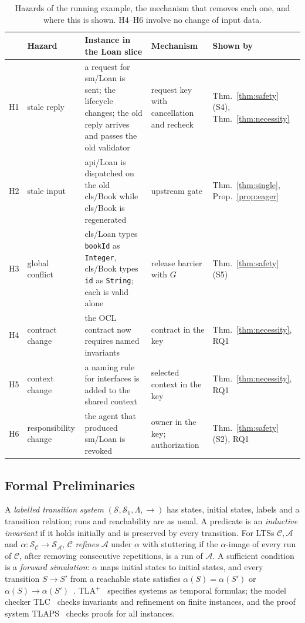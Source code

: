 \documentclass[pdflatex,sn-mathphys-num]{sn-jnl}
\theoremstyle{thmstyleone}%
\theoremstyle{thmstyletwo}%
\theoremstyle{thmstylethree}%
\newcommand{\tla}{TLA$^+$}
\newcommand{\vw}[1]{\textsf{#1}}
\begin{document}
\begin{table}[!ht]
\caption{Hazards of the running example, the mechanism that removes each one, and where this is shown. H4--H6 involve no change of input data.}\label{tab:hazards}
\footnotesize\setlength{\tabcolsep}{3pt}
\begin{tabular}{@{}lP{19mm}P{43mm}P{30mm}P{21mm}@{}}\toprule
 & Hazard & Instance in the Loan slice & Mechanism & Shown by\\\midrule
H1 & stale reply & a request for \vw{sm/Loan} is sent; the lifecycle changes; the old reply arrives and passes the old validator & request key with cancellation and recheck & Thm.~\ref{thm:safety} (S4), Thm.~\ref{thm:necessity}\\
H2 & stale input & \vw{api/Loan} is dispatched on the old \vw{cls/Book} while \vw{cls/Book} is regenerated & upstream gate & Thm.~\ref{thm:single}, Prop.~\ref{prop:eager}\\
H3 & global conflict & \vw{cls/Loan} types \texttt{bookId} as \texttt{Integer}, \vw{cls/Book} types \texttt{id} as \texttt{String}; each is valid alone & release barrier with $G$ & Thm.~\ref{thm:safety} (S5)\\
H4 & contract change & the OCL contract now requires named invariants & contract in the key & Thm.~\ref{thm:necessity}, RQ1\\
H5 & context change & a naming rule for interfaces is added to the shared context & selected context in the key & Thm.~\ref{thm:necessity}, RQ1\\
H6 & responsibility change & the agent that produced \vw{sm/Loan} is revoked & owner in the key; authorization & Thm.~\ref{thm:safety} (S2), RQ1\\\bottomrule
\end{tabular}
\end{table}

\subsection{Formal Preliminaries}
A \emph{labelled transition system} $(\mathcal S,\mathcal S_0,\Lambda,\to)$ has states, initial states, labels and a transition relation; runs and reachability are as usual. A predicate is an \emph{inductive invariant} if it holds initially and is preserved by every transition. For LTSs $\mathcal C,\mathcal A$ and $\alpha:\mathcal S_{\mathcal C}\to\mathcal S_{\mathcal A}$, $\mathcal C$ \emph{refines} $\mathcal A$ under $\alpha$ with stuttering if the $\alpha$-image of every run of $\mathcal C$, after removing consecutive repetitions, is a run of $\mathcal A$. A sufficient condition is a \emph{forward simulation}: $\alpha$ maps initial states to initial states, and every transition $S\to S'$ from a reachable state satisfies $\alpha(S)=\alpha(S')$ or $\alpha(S)\to\alpha(S')$~\cite{abadi1991refinement,lynch1995simulations}. \tla{}~\cite{lamport2002specifying} specifies systems as temporal formulas; the model checker TLC~\cite{yu1999tlc} checks invariants and refinement on finite instances, and the proof system TLAPS~\cite{cousineau2012tlaps} checks proofs for all instances.
\end{document}
